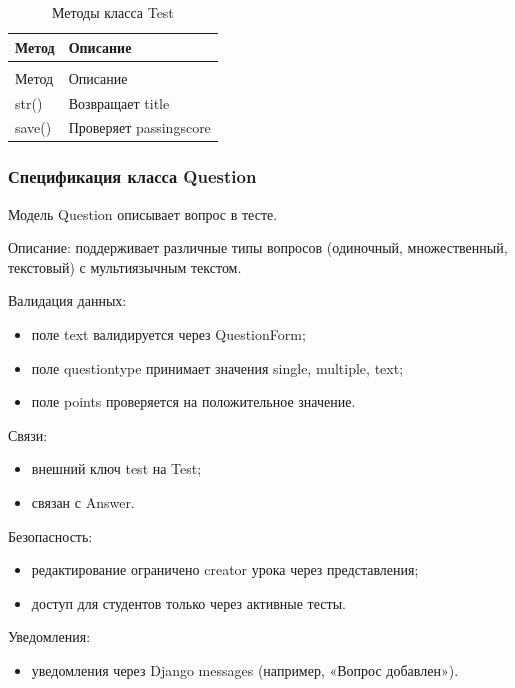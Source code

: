 \begin{xltabular}{\textwidth}{|l|X|}
	\caption{Методы класса Test\label{tab:test_methods}}\\
	\hline
	Метод & Описание \\ \hline
	\endfirsthead
	\\
	\hline
	Метод & Описание \\ \hline
	\endhead
	str() & Возвращает title \\ \hline
	save() & Проверяет passingscore \\ \hline
\end{xltabular}

\subsubsection{Спецификация класса Question}

Модель Question описывает вопрос в тесте.


Описание: поддерживает различные типы вопросов (одиночный, множественный, текстовый) с мультиязычным текстом.

Валидация данных:
	\begin{itemize}
		\item поле text валидируется через QuestionForm;
		\item поле questiontype принимает значения single, multiple, text;
		\item поле points проверяется на положительное значение.
	\end{itemize}
	
Связи:
	\begin{itemize}
		\item внешний ключ test на Test;
		\item связан с Answer.
	\end{itemize}
	
Безопасность:
	\begin{itemize}
		\item редактирование ограничено creator урока через представления;
		\item доступ для студентов только через активные тесты.
	\end{itemize}
	
Уведомления:
	\begin{itemize}
		\item уведомления через Django messages (например, «Вопрос добавлен»).
	\end{itemize}
	
